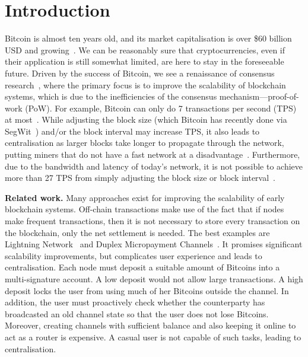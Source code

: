 \section{Introduction}

Bitcoin is almost ten years old, and its market capitalisation is over \$60 billion USD and growing~\cite{bitcoinmarketcap}.
We can be reasonably sure that cryptocurrencies,
even if their application is still somewhat limited,
are here to stay in the foreseeable future.
Driven by the success of Bitcoin, we see a renaissance of consensus research~\cite{miller2016honey, kogias2016enhancing, kokoris2017omniledger},
where the primary focus is to improve the scalability of blockchain systems,
which is due to the inefficiencies of the consensus mechanism---proof-of-work (PoW).
For example, Bitcoin can only do 7 transactions per second (TPS) at most~\cite{vukolic2015quest}.
While adjusting the block size (which Bitcoin has recently done via SegWit~\cite{segwit}) and/or the block interval may increase TPS,
it also leads to centralisation as larger blocks take longer to propagate through the network,
putting miners that do not have a fast network at a disadvantage~\cite{croman2016scaling}.
Furthermore, due to the bandwidth and latency of today's network,
it is not possible to achieve more than 27 TPS from simply adjusting the block size or block interval~\cite{croman2016scaling}.

\textbf{Related work.\quad}
Many approaches exist for improving the scalability of early blockchain systems.
Off-chain transactions make use of the fact that if nodes make frequent transactions,
then it is not necessary to store every transaction on the blockchain,
only the net settlement is needed.
The best examples are Lightning Network~\cite{lightningnetwork} and Duplex Micropayment Channels~\cite{decker2015fast}.
It promises significant scalability improvements, but complicates user experience and leads to centralisation.
Each node must deposit a suitable amount of Bitcoins into a multi-signature account.
A low deposit would not allow large transactions.
A high deposit locks the user from using much of her Bitcoins outside the channel.
In addition, the user must proactively check whether the counterparty has broadcasted an old channel state so that the user does not lose Bitcoins.
Moreover, creating channels with sufficient balance and also keeping it online to act as a router is expensive.
A casual user is not capable of such tasks, leading to centralisation.

